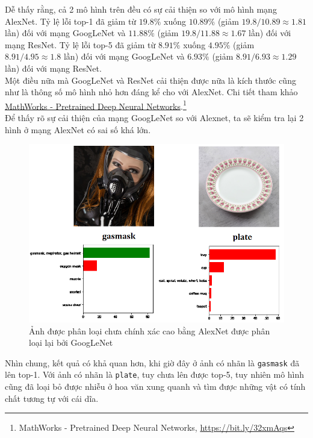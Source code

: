 \documentclass[a4paper]{article}
\begin{document}
\noindent
Dễ thấy rằng, cả 2 mô hình trên đều có sự cải thiện so với mô hình mạng AlexNet. Tỷ lệ lỗi top-1 đã giảm từ $19.8\%$ xuống $10.89\%$ (giảm $19.8/10.89 \approx 1.81$ lần) đối với mạng GoogLeNet và $11.88\%$ (giảm $19.8/11.88 \approx 1.67$ lần) đối với mạng ResNet. Tỷ lệ lỗi top-5 đã giảm từ $8.91\%$ xuống $4.95\%$ (giảm $8.91/4.95 \approx 1.8$ lần) đối với mạng GoogLeNet và $6.93\%$ (giảm $8.91/6.93 \approx 1.29$ lần) đối với mạng ResNet.\\
Một điều nữa mà GoogLeNet và ResNet cải thiện được nữa là kích thước cũng như là thông số mô hình nhỏ hơn đáng kể cho với AlexNet. Chi tiết tham khảo \href{https://www.mathworks.com/help/deeplearning/ug/pretrained-convolutional-neural-networks.html}{MathWorks - Pretrained Deep Neural Networks}.\footnote{MathWorks - Pretrained Deep Neural Networks, \href{https://bit.ly/32xmAqs}{https://bit.ly/32xmAqs}}\\
Để thấy rõ sự cải thiện của mạng GoogLeNet so với Alexnet, ta sẽ kiểm tra lại 2 hình ở mạng AlexNet có sai số khá lớn.
\begin{figure}[h!]
\centering
\includegraphics[width=15cm]{images/res3.PNG}
\caption*{Ảnh được phân loại chưa chính xác cao bằng AlexNet được phân loại lại bởi GoogLeNet}
\end{figure}

\noindent
Nhìn chung, kết quả có khả quan hơn, khi giờ đây ở ảnh có nhãn là \texttt{gasmask} đã lên top-1. Với ảnh có nhãn là \texttt{plate}, tuy chưa lên được top-5, tuy nhiên mô hình cũng đã loại bỏ được nhiễu ở hoa văn xung quanh và tìm được những vật có tính chất tương tự với cái dĩa.
\end{document}
